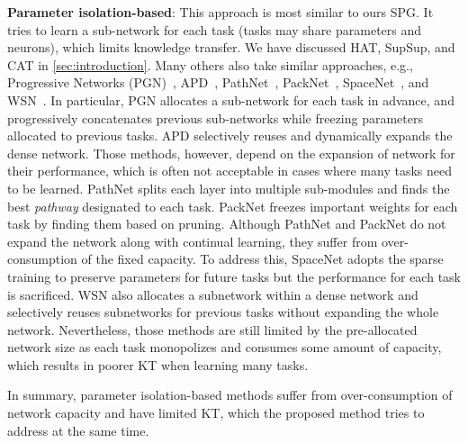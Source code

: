 \textbf{Parameter isolation-based}:
This approach is most similar to ours SPG.
It tries to learn a sub-network for each task (tasks may share parameters and neurons), which limits knowledge transfer. We have discussed HAT, SupSup, and CAT in \cref{sec:introduction}.
Many others also take similar approaches, e.g., 
Progressive Networks (PGN)~\citep{pgn}, APD~\citep{apd}, PathNet~\citep{pathnet}, PackNet~\citep{packnet}, SpaceNet~\citep{spacenet}, and WSN~\citep{wsn}. 
In particular, PGN allocates a sub-network for each task in advance, and progressively concatenates previous sub-networks while freezing parameters allocated to previous tasks.
APD selectively reuses and dynamically expands the dense network.
Those methods, however, depend on the expansion of network for their performance, which is often not acceptable in cases where many tasks need to be learned.
PathNet splits each layer into multiple sub-modules and finds the best \textit{pathway} designated to each task. 
PackNet freezes important weights for each task by finding them based on pruning.
Although PathNet and PackNet do not expand 
the network along with continual learning, they suffer from  over-consumption of the fixed capacity.
To address this, SpaceNet adopts the sparse training to preserve parameters for future tasks but the performance for each task is sacrificed.
WSN also allocates a subnetwork within a dense network
and selectively reuses subnetworks for previous tasks without expanding the whole network.
Nevertheless, those methods are still limited by the pre-allocated network size as each task monopolizes and consumes some amount of capacity, which results in poorer KT when learning many tasks.


In summary, parameter isolation-based methods suffer from over-consumption of network capacity and have limited KT, which the proposed method tries to address at the same time.




